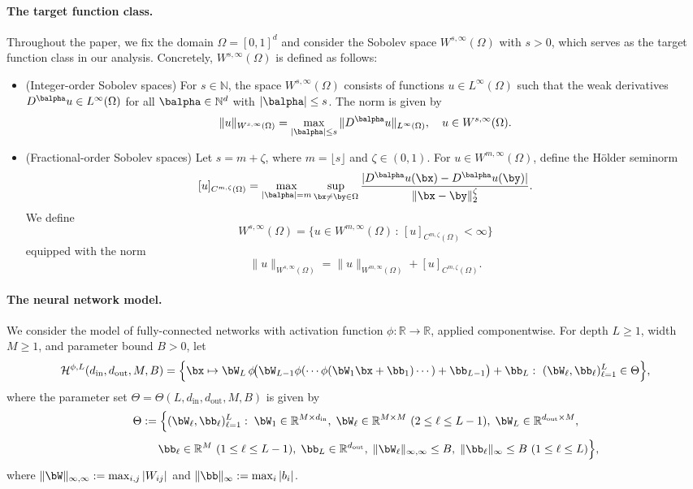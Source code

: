 \documentclass[11pt]{article}
\begin{document}
\paragraph*{The target function class.}
Throughout the paper, we fix the domain $\Omega = [0,1]^d$ and consider the Sobolev space $W^{s,\infty}(\Omega)$ with  $s > 0$, which serves as the target function class in our analysis. Concretely, $W^{s,\infty}(\Omega)$ is defined as follows:
    \begin{itemize}
        \item (Integer-order Sobolev spaces) For $s \in \mathbb{N}$, the space $W^{s,\infty}(\Omega)$ consists of functions $u \in L^{\infty}(\Omega)$ such that the weak derivatives $D^{\balpha} u \in L^{\infty}(\Omega)$ for all $\balpha \in \mathbb{N}^d$ with $|\balpha| \leq s$. The norm is given by
        \begin{equation*}
            \|u\|_{W^{s,\infty}(\Omega)} = \max_{|\balpha| \leq s} \|D^{\balpha} u\|_{L^{\infty}(\Omega)}, \quad u \in W^{s,\infty}(\Omega).
        \end{equation*}
        \item (Fractional-order Sobolev spaces) Let $s=m+\zeta$, where $m=\lfloor s \rfloor$ and $\zeta \in (0,1)$. 
For $u \in W^{m,\infty}(\Omega)$, define the Hölder seminorm
\[
[u]_{C^{m,\zeta}(\Omega)}
=
\max_{|\balpha|=m}
\sup_{\bx \neq \by \in \Omega}
\frac{|D^{\balpha} u(\bx)-D^\balpha u(\by)|}{\|\bx-\by\|_2^\zeta}.
\]
We define
\[
W^{s,\infty}(\Omega) = \{u\in W^{m,\infty}(\Omega)\,:\, [u]_{C^{m,\zeta}(\Omega)}<\infty\}
\]
equipped with the norm
\[
\|u\|_{W^{s,\infty}(\Omega)}
=
\|u\|_{W^{m,\infty}(\Omega)}
+
[u]_{C^{m,\zeta}(\Omega)}.
\]
    \end{itemize}



\paragraph*{The neural network model.}
We consider the model of fully-connected   networks
with activation function $\phi:\mathbb{R}\to\mathbb{R}$,
applied componentwise.
For depth $L\ge 1$, width $M\ge 1$, and parameter bound $B>0$, let
\begin{equation*}
\mathcal{H}^{\phi, L}(d_{\mathrm{in}},d_{\mathrm{out}},M,B)
=
\Big\{
\bx\mapsto 
\bW_L\,\phi\!\big(
\bW_{L-1}\phi(\cdots \phi(\bW_1\bx+\bb_1)\cdots)+\bb_{L-1}
\big)
+\bb_L
:\ (\bW_\ell,\bb_\ell)_{\ell=1}^L\in\Theta
\Big\},
\end{equation*}
where the parameter set $\Theta=\Theta(L,d_{\mathrm{in}},d_{\mathrm{out}},M,B)$ is given by
\[
\Theta :=
\Big\{
(\bW_\ell,\bb_\ell)_{\ell=1}^L:
\; \bW_1\in\mathbb{R}^{M\times d_{\mathrm{in}}},\;
\bW_\ell\in\mathbb{R}^{M\times M}\ (2\le \ell\le L-1),\;
\bW_L\in\mathbb{R}^{d_{\mathrm{out}}\times M},
\]
\[
\qquad\qquad
\bb_\ell\in\mathbb{R}^{M}\ (1\le \ell\le L-1),\;
\bb_L\in\mathbb{R}^{d_{\mathrm{out}}},
\;
\|\bW_\ell\|_{\infty,\infty}\le B,\;
\|\bb_\ell\|_\infty\le B\ (1\le \ell\le L)
\Big\},
\]
where  $\|\bW\|_{\infty,\infty} := \max_{i,j} |W_{ij}|$  and
$\|\bb\|_\infty := \max_i |b_i|$.
\end{document}
